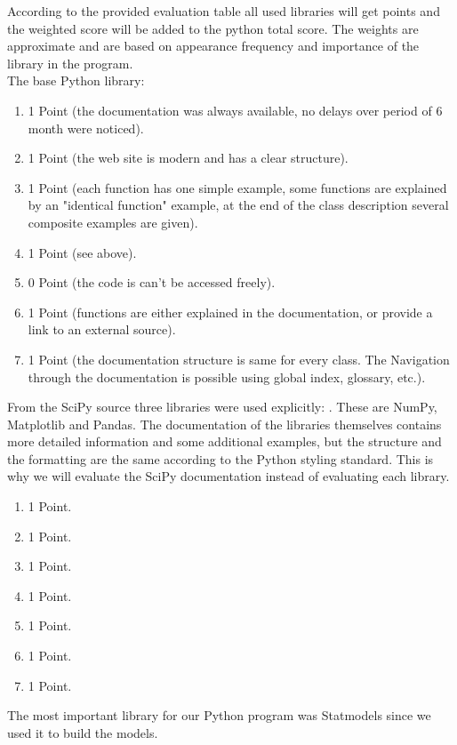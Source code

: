 \documentclass[
  twoside,
  12pt, a4paper,
  footinclude=true,
  headinclude=true,
  cleardoublepage=empty
]{article}
\begin{document}
According to the provided evaluation table all used libraries will get points and the weighted score will be added to the python total score. The weights are approximate and are based on appearance frequency and importance of the library in the program.\\
The base Python library:
\begin{enumerate}
    \item 1 Point (the documentation was always available, no delays over period of 6 month were noticed).
    \item 1 Point (the web site is modern and has a clear structure).
    \item 1 Point (each function has one simple example, some functions are explained by an "identical function" example, at the end of the class description several composite examples are given).
    \item 1 Point (see above).
    \item 0 Point (the code is can't be accessed freely).
    \item 1 Point (functions are either explained in the documentation, or provide a link to an external source).
    \item 1 Point (the documentation structure is same for every class. The Navigation through the documentation is possible using global index, glossary, etc.).
\end{enumerate}
From the SciPy source three libraries were used explicitly:
. These are NumPy, Matplotlib and Pandas. The documentation of the libraries themselves contains more detailed information and some additional examples, but the structure and the formatting are the same according to the Python styling standard. This is why we will evaluate the SciPy documentation instead of evaluating each library.
\begin{enumerate}
    \item 1 Point.
    \item 1 Point.
    \item 1 Point.
    \item 1 Point.
    \item 1 Point.
    \item 1 Point.
    \item 1 Point.
\end{enumerate}
The most important library for our Python program was Statmodels since we used it to build the models.
\end{document}
